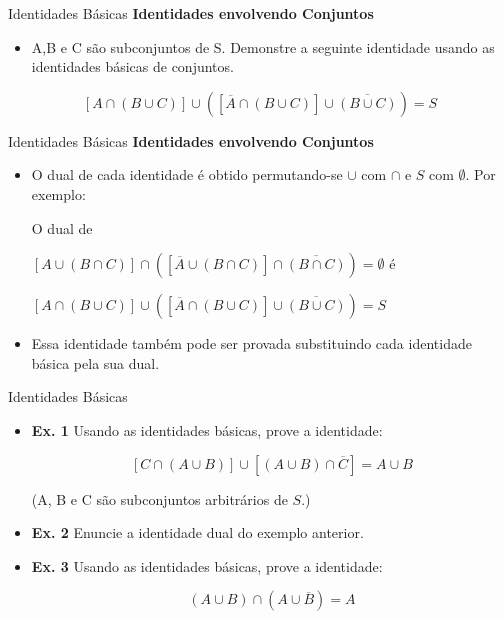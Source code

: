 \documentclass[aspectratio=169]{beamer}
\begin{document}
\begin{frame}{Identidades Básicas}
    \textbf{Identidades envolvendo Conjuntos}

    \begin{itemize}
        \item A,B e C são subconjuntos de S. Demonstre a seguinte identidade usando as identidades básicas de conjuntos.
    \end{itemize}
    
    \[ [A \cap (B \cup C)] \cup ([\overline{A} \cap (B \cup C)] \cup \overline{(B \cup C)}) = S \]
    \end{frame}

    \begin{frame}{Identidades Básicas}
        \textbf{Identidades envolvendo Conjuntos}

        \begin{itemize}
    \item O dual de cada identidade é obtido permutando-se $\cup$
com $\cap$ e $S$ com $\emptyset$. Por exemplo: 

O dual de 

    
    \begin{center}
        $
        [A \cup (B \cap C)] \cap \left([\overline{A} \cup (B \cap C)] \cap \overline{(B \cap C)}\right) = \emptyset
        $ é
        
        $
        [A \cap (B \cup C)] \cup \left([\overline{A} \cap (B \cup C)] \cup \overline{(B \cup C)}\right) = S
        $
    \end{center}
    


\item Essa identidade também pode ser provada substituindo
cada identidade básica pela sua dual.

        \end{itemize}
    \end{frame}


\begin{frame}{Identidades Básicas}
    \begin{itemize}
        \item \textbf{Ex. 1} Usando as identidades básicas, prove a identidade:

            \[
            [C \cap (A \cup B)] \cup \left[(A \cup B) \cap \overline{C}\right] = A \cup B
            \]

            \begin{center}
                (A, B e C são subconjuntos arbitrários de $S$.)
            \end{center}
        \item \textbf{Ex. 2} Enuncie a identidade dual do exemplo anterior.

        \item \textbf{Ex. 3} Usando as identidades básicas, prove a identidade: 
        
        \[
        (A \cup B) \cap (A \cup \overline{B}) = A
        \]
    \end{itemize}
    \end{frame}
\end{document}
